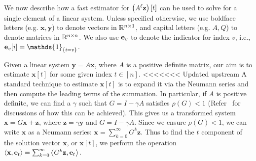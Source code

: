 We now describe how a fast estimator for $\left(A^{\ell}\mathbf{z}\right)[t]$ can be used to solve for a single element of a linear system.
Unless specified otherwise, we use boldface letters (e.g. $\mathbf{x},\mathbf{y}$) to denote vectors in $\mathbb{R}^{n\times 1}$, and capital letters (e.g. $A,Q$) to denote matrices in $\mathbb{R}^{n\times n}$.
We also use $\mathbf{e}_v$ to denote the indicator for index $v$, i.e., $\be_v[i] = \mathds{1}_{\{i=v\}}$. 


Given a linear system $\mathbf{y} = A\mathbf{x}$, where $A$ is a positive definite matrix, our aim is to estimate $\mathbf{x}[t]$ for some given index $t\in[n]$. 
<<<<<<< Updated upstream
A standard technique to estimate $\mathbf{x}[t]$ is to expand it via the Neumann series and then compute the leading terms of the summation.
In particular, if $A$ is positive definite, we can find a $\gamma$ such that $G = I - \gamma A$ satisfies $\rho(G) < 1$ (Refer~\cite{dimov2015new,lee2014asynchronous} for discussions of how this can be achieved). 
This gives us a transformed system $\mathbf{x} = G\mathbf{x} + \mathbf{z}$, where $\mathbf{z} = \gamma \mathbf{y}$ and $G = I - \gamma A$. 
Since we ensure $\rho(G)<1$, we can write $\mathbf{x}$ as a Neumann series: $\mathbf{x} = \sum_{k=0}^\infty G^k \mathbf{z}$.
Thus to find the $t$ component of the solution vector $\mathbf{x}$, or $\mathbf{x}[t]$, we perform the operation $\left< \mathbf{x}, \mathbf{e}_t \right> = \sum_{k=0}^\infty \left< G^k \mathbf{z}, \mathbf{e}_t \right>$. 


